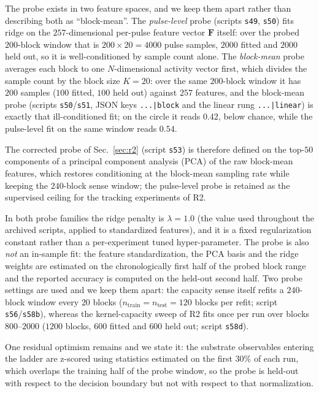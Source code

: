 \documentclass[preprint,12pt]{elsarticle}
\begin{document}
The probe exists in two feature spaces, and we keep
them apart rather than describing both as ``block-mean''. The
\emph{pulse-level} probe (scripts \texttt{s49}, \texttt{s50}) fits ridge on
the $257$-dimensional per-pulse feature vector $\mathbf F$ itself: over the
probed $200$-block window that is $200\times20=4000$ pulse samples, $2000$
fitted and $2000$ held out, so it is well-conditioned by sample count alone.
The \emph{block-mean} probe averages each block to one $N$-dimensional
activity vector first, which divides the sample count by the block size
$K=20$: over the same $200$-block window it has $200$ samples ($100$ fitted,
$100$ held out) against $257$ features, and the block-mean probe
(scripts \texttt{s50}/\texttt{s51}, JSON keys \texttt{...|block} and the
linear rung \texttt{...|linear}) is
exactly that ill-conditioned fit; on the circle it reads $0.42$, below
chance, while the pulse-level fit on the same window reads $0.54$.

The
corrected probe of Sec.~\ref{sec:r2} (script \texttt{s53}) is therefore
defined on the top-$50$ components of a principal component analysis (PCA) of
the raw block-mean features, which
restores conditioning at the block-mean sampling rate while keeping the
$240$-block sense window; the pulse-level probe is retained as the supervised
ceiling for the tracking experiments of R2.

In both probe families the ridge
penalty is
$\lambda=1.0$ (the value used throughout the archived scripts, applied to
standardized features), and it is a fixed regularization constant rather
than a per-experiment tuned hyper-parameter. The probe is also \emph{not}
an in-sample fit: the feature standardization, the PCA basis and the ridge
weights are estimated on the chronologically first half of the probed block
range and the reported accuracy is computed on the held-out second half. Two
probe settings are used and we keep them apart: the capacity sense itself
refits a $240$-block window every $20$ blocks ($n_{\mathrm{train}}=
n_{\mathrm{test}}=120$ blocks per refit; script \texttt{s56}/\texttt{s58b}),
whereas the kernel-capacity sweep of R2 fits once per run over blocks
$800$--$2000$ ($1200$ blocks, $600$ fitted and $600$ held out; script
\texttt{s58d}).

One residual optimism remains and we state it: the
substrate observables entering the ladder are z-scored using statistics
estimated on the first $30\%$ of each run, which overlaps the training half
of the probe window, so the probe is held-out with respect to the decision
boundary but not with respect to that normalization.
\end{document}
